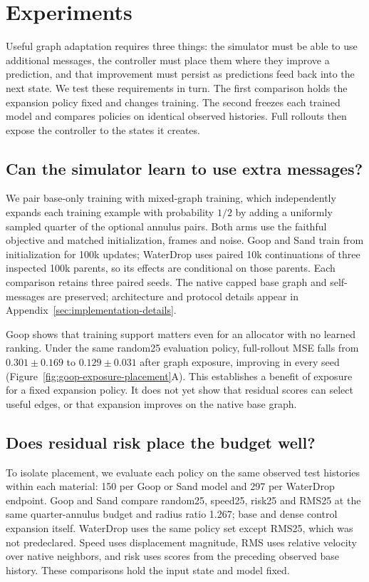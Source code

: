 \section{Experiments}
Useful graph adaptation requires three things: the simulator must be able to use additional messages, the controller must place them where they improve a prediction, and that improvement must persist as predictions feed back into the next state. We test these requirements in turn. The first comparison holds the expansion policy fixed and changes training. The second freezes each trained model and compares policies on identical observed histories. Full rollouts then expose the controller to the states it creates.

\subsection{Can the simulator learn to use extra messages?}
We pair base-only training with mixed-graph training, which independently expands each training example with probability $1/2$ by adding a uniformly sampled quarter of the optional annulus pairs. Both arms use the faithful objective and matched initialization, frames and noise. Goop and Sand train from initialization for 100k updates; WaterDrop uses paired 10k continuations of three inspected 100k parents, so its effects are conditional on those parents. Each comparison retains three paired seeds. The native capped base graph and self-messages are preserved; architecture and protocol details appear in Appendix~\ref{sec:implementation-details}.

Goop shows that training support matters even for an allocator with no learned ranking. Under the same random25 evaluation policy, full-rollout MSE falls from $0.301\pm0.169$ to $0.129\pm0.031$ after graph exposure, improving in every seed (Figure~\ref{fig:goop-exposure-placement}A). This establishes a benefit of exposure for a fixed expansion policy. It does not yet show that residual scores can select useful edges, or that expansion improves on the native base graph.


\subsection{Does residual risk place the budget well?}
To isolate placement, we evaluate each policy on the same observed test histories within each material: 150 per Goop or Sand model and 297 per WaterDrop endpoint. Goop and Sand compare random25, speed25, risk25 and RMS25 at the same quarter-annulus budget and radius ratio 1.267; base and dense control expansion itself. WaterDrop uses the same policy set except RMS25, which was not predeclared. Speed uses displacement magnitude, RMS uses relative velocity over native neighbors, and risk uses scores from the preceding observed base history. These comparisons hold the input state and model fixed.

